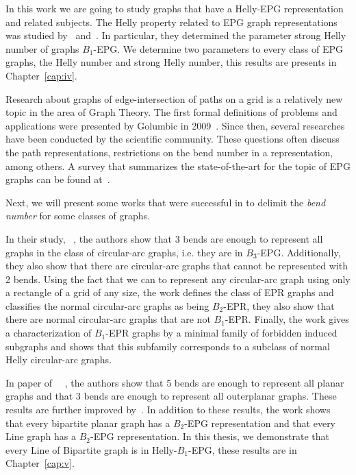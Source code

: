 In this work we are going to study graphs that have a Helly-EPG representation and related subjects.  The Helly property related to EPG graph representations was studied by~\cite{golumbic2009} and~\cite{golumbic2013}. In particular, they determined the parameter strong Helly number of graphs $ B_1$-EPG. We determine two parameters to every class of EPG graphs, the Helly number and strong Helly number, this results are presents in Chapter~\ref{cap:iv}.

Research about graphs of edge-intersection of  paths on a grid is a relatively new topic in the area of Graph Theory. The first formal definitions of problems and applications were presented by Golumbic in 2009~\cite{golumbic2009}. Since then, several researches have been conducted by the scientific community. These questions often discuss the path representations, restrictions on the bend number in a representation, among others. 
A survey that summarizes the state-of-the-art for the topic of EPG graphs can be found at~\cite{chung201950}. 

Next, we will present some works that were successful in to delimit the \emph{bend number} for some classes of graphs.

In their study, \citeauthor{alcon2016}~\cite{alcon2016}, the authors show that 3 bends are enough to represent all graphs in the class of circular-arc graphs, i.e. they are in $ B_3$-EPG. Additionally, they also show that there are circular-arc graphs that cannot be represented with 2 bends. Using the fact that we can to represent any circular-arc graph using only a rectangle of a grid of any size, the work defines the class of EPR graphs and classifies the normal circular-arc graphs  as being $ B_2$-EPR, they also show that there are normal circular-arc graphs that are not $ B_1$-EPR. Finally, the work gives a characterization of $ B_1$-EPR graphs by a minimal family of forbidden induced subgraphs and shows that this subfamily corresponds to a subclass of normal Helly circular-arc graphs.


In paper of ~\citeauthor{biedl2010}~\cite{biedl2010}, the authors show that 5 bends are enough to represent all planar graphs and that 3 bends are enough to represent all outerplanar graphs. These results are further improved by~\cite{daniel2014b}. In addition to these results, the work shows that every bipartite planar graph has a $B_2$-EPG representation and that every Line graph has a $B_2$-EPG representation. In this thesis, we demonstrate that every Line of Bipartite graph is in Helly-$B_1$-EPG, these results are in Chapter~\ref{cap:v}.

